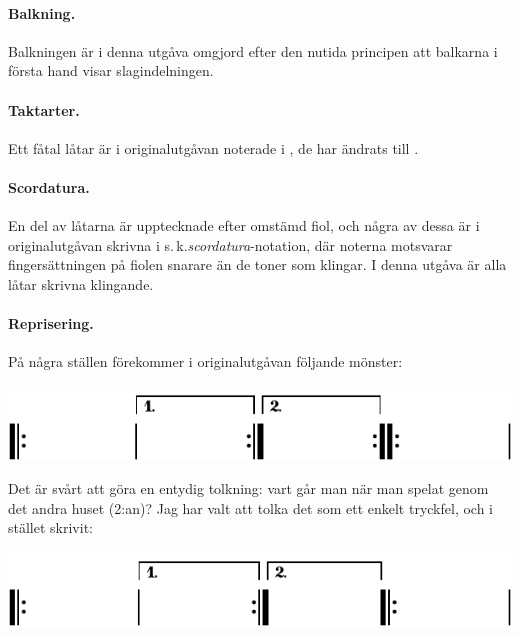 {\paragraph{Balkning.} Balkningen är i denna utgåva omgjord efter den nutida principen
att balkarna i första hand visar slagindelningen.

\begingroup
{}
\paragraph{Taktarter.} Ett fåtal låtar är i originalutgåvan noterade i ,
de har ändrats till .
\endgroup

\paragraph{Scordatura.} En del av låtarna är upptecknade efter omstämd fiol, och några av
dessa är i originalutgåvan skrivna i s.\,k.\@ \textit{scordatura}-notation, där noterna
motsvarar fingersättningen på fiolen snarare än de toner som klingar. I denna
utgåva är alla låtar skrivna klingande.

\paragraph{Reprisering.} På några ställen förekommer i originalutgåvan följande mönster:

\vspace{3mm}
\includegraphics{include/snippets/repriser-fel-crop.pdf}
\vspace{3mm}

{
\setlength{\parindent}{0em}
Det är svårt att göra en entydig tolkning: vart går man när man spelat genom det
andra \guillemotright{}huset\guillemotright{} (2:an)? Jag har valt att tolka det som ett enkelt tryckfel, och
i stället skrivit:
}

\vspace{3mm}
\includegraphics{include/snippets/repriser-ratt-crop.pdf}

}
\restoregeometry
\fancyhfoffset[E,O]{0pt}

